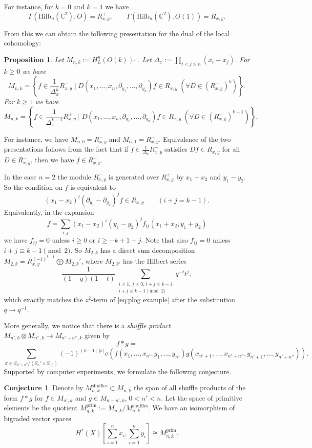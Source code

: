 \documentclass[12pt]{amsart}
\newtheorem{prop}[theorem]{Proposition}
\theoremstyle{definition}
\newtheorem{conjecture}[theorem]{Conjecture}
\theoremstyle{remark}
\numberwithin{equation}{section}
\begin{document}
	For instance, for $k=0$ and $k=1$ we have 
	\[
	\Gamma(\mathrm{Hilb}_n(\mathbb{C}^2), O) = R_{x,y}^+, \qquad
	\Gamma(\mathrm{Hilb}_n(\mathbb{C}^2), O(1)) = R_{x,y}^-.
	\]
	
	From this we can obtain the following presentation for the dual of the local cohomology:
	\begin{prop}
		Let  $M_{n,k}:=H^n_L(O(k))\;\check{}\;$. Let $\Delta_x := \prod_{i<j\leq n} (x_i - x_j)$. For $k\geq 0$ we have 
		\[
		M_{n,k} = \left\{f\in \frac{1}{\Delta_x^k} R_{x,y}^- \;\Big|\; D(x_1,\ldots,x_n,\partial_{y_1},\ldots,\partial_{y_n}) f\in R_{x,y} \; (\forall D\in (R_{x,y}^-)^k) \right\}.
		\]
		For $k\geq 1$ we have
		\[
		M_{n,k} = \left\{f\in \frac{1}{\Delta_x^{k-1}} R_{x,y}^+ \;\Big|\; D(x_1,\ldots,x_n,\partial_{y_1},\ldots,\partial_{y_n}) f\in R_{x,y} \; (\forall D\in (R_{x,y}^-)^{k-1}) \right\}.
		\]
	\end{prop}
	For instance, we have $M_{n,0}=R_{x,y}^-$ and $M_{n,1}=R_{x,y}^+$. Equivalence of the two presentations follows from the fact that if $f\in \frac{1}{\Delta_x} R_{x,y}^-$ satisfies $Df\in R_{x,y}$ for all $D\in R_{x,y}^-$, then we have $f\in R_{x,y}^+$.
	
	In the case $n=2$ the module $R_{x,y}^-$ is generated over $R_{x,y}^+$ by $x_1-x_2$ and $y_1-y_2$. So the condition on $f$ is equivalent to 
	\[
	(x_1-x_2)^i (\partial_{y_1} - \partial_{y_2})^j f \in R_{x,y} \qquad(i+j=k-1).
	\]
	Equivalently, in the expansion
	\[
	f = \sum_{i,j} (x_1-x_2)^i (y_1-y_2)^j f_{ij}(x_1+x_2, y_1+y_2)
	\]
	we have $f_{ij}=0$ unless $i\geq 0$ or $i\geq -k+1+j$. Note that also $f_{ij}=0$ unless $i+j\equiv k-1\pmod{2}$. So $M_{2,k}$ has a direct sum decomposition $M_{2,k} = R_{x,y}^{(-1)^{k-1}} \bigoplus M_{2,k}'$, where $M_{2,k'}$ has the Hilbert series 
	\[
	\frac{1}{(1-q)(1-t)}\sum_{\substack{i\geq 1,\,j\geq 0,\,i+j\leq k-1\\i+j\equiv k-1\pmod{2}}} q^{-i} t^j,
	\]
	which exactly matches the $z^2$-term of \eqref{eq:plog example} after the substitution $q\to q^{-1}$.
	
	More generally, we notice that there is a \emph{shuffle product} $M_{n',k} \otimes M_{n'',k} \to M_{n'+n'',k}$ given by
	\[
	f\ast g =  
	\]
	\[
	\sum_{\sigma\in S_{n'+n''}/(S_n'\times S_{n''})} (-1)^{(k-1)|\sigma|} \sigma \left(f(x_1,\ldots,x_{n'},y_1,\ldots,y_{n'}) g(x_{n'+1},\ldots,x_{n'+n''},y_{n'+1},\ldots,y_{n'+n''})\right).
	\]
	Supported by computer experiments, we formulate the following conjecture.
	\begin{conjecture}\label{conj:iso vector spaces}
		Denote by $M_{n,k}^\textrm{shuffles}\subset M_{n,k}$ the span of all shuffle products of the form $f\ast g$ for $f\in M_{n',k}$ and $g\in M_{n-n',k}$, $0<n'<n$. Let the space of primitive elements be the quotient $M_{n,k}^\textrm{prim}:=M_{n,k} / M_{n,k}^\textrm{shuffles}$. We have an isomorphism of bigraded vector spaces
		\[
		H^*(X)\left[\sum_{i=1}^n x_i, \sum_{i=1}^n y_i\right] \cong M_{n,k}^\textrm{prim}.
		\]
	\end{conjecture}
	
\end{document}
